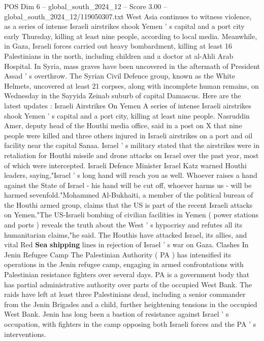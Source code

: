 \begin{textsample}{POS Dim 6 – global\_south\_2024\_12 – Score 3.00 – global\_south\_2024\_12/119050307.txt}  \label{ex:f6_pos_433}
West Asia continues to witness violence, as a series of intense Israeli airstrikes shook Yemen ' s capital and a port city early Thursday, killing at least nine people, according to local media.
Meanwhile, in Gaza, Israeli forces carried out heavy bombardment, killing at least 16 Palestinians in the north, including children and a doctor at al-Ahli Arab Hospital.
In Syria, mass graves have been uncovered in the aftermath of President Assad ' s overthrow.
The Syrian Civil Defence group, known as the White Helmets, uncovered at least 21 corpses, along with incomplete human remains, on Wednesday in the Sayyida Zeinab suburb of capital Damascus.
Here are the latest updates : Israeli Airstrikes On Yemen A series of intense Israeli airstrikes shook Yemen ' s capital and a port city, killing at least nine people.
Nasruddin Amer, deputy head of the Houthi media office, said in a post on X that nine people were killed and three others injured in Israeli airstrikes on a port and oil facility near the capital Sanaa.
Israel ' s military stated that the airstrikes were in retaliation for Houthi missile and drone attacks on Israel over the past year, most of which were intercepted.
Israeli Defence Minister Israel Katz warned Houthi leaders, saying,"Israel ' s long hand will reach you as well.
Whoever raises a hand against the State of Israel - his hand will be cut off, whoever harms us - will be harmed sevenfold."Mohammed Al-Bukhaiti, a member of the political bureau of the Houthi armed group, claims that the US is part of the recent Israeli attacks on Yemen."The US-Israeli bombing of civilian facilities in Yemen ( power stations and ports ) reveals the truth about the West ' s hypocrisy and refutes all its humanitarian claims,"he said.
The Houthis have attacked Israel, its allies, and vital Red \textbf{Sea} \textbf{shipping} lines in rejection of Israel ' s war on Gaza.
Clashes In Jenin Refugee Camp The Palestinian Authority ( PA ) has intensified its operations in the Jenin refugee camp, engaging in armed confrontations with Palestinian resistance fighters over several days.
PA is a government body that has partial administrative authority over parts of the occupied West Bank.
The raids have left at least three Palestinians dead, including a senior commander from the Jenin Brigades and a child, further heightening tensions in the occupied West Bank.
Jenin has long been a bastion of resistance against Israel ' s occupation, with fighters in the camp opposing both Israeli forces and the PA ' s interventions.

\end{textsample}
